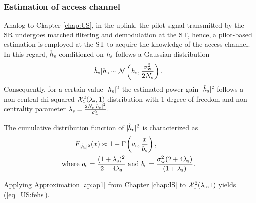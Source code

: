\subsubsection{Estimation of access channel}
Analog to Chapter \ref{chap:US}, in the uplink, the pilot signal transmitted by the SR undergoes matched filtering and demodulation at the ST, hence, a pilot-based estimation is employed at the ST to acquire the knowledge of the access channel. %
In this regard, $\hat{h}_{\text{s}}$ conditioned on $h_{\text{s}}$ follows a Gaussian distribution
\begin{align}
\hat{h}_{\text{s}}|h_{\text{s}} \sim \mathcal{N}\left( h_{\text{s}},\frac{\sigma^2_{\text{w}}}{2 N_{\text{s}}} \right).
\label{eq_US:ehs} 
\end{align}
Consequently, for a certain value $|h_{\text{s}}|^2$ the estimated power gain $|\hat{h}_{\text{s}}|^2$ follows a non-central chi-squared $\ncchi2(\ls, 1)$ distribution with 1 degree of freedom and non-centrality parameter $\lambda_{\text{s}} = \frac{2 N_{\text{s}} |h_{\text{s}}|^2}{\sigma^2_{\text{w}}}$. 
\begin{lemma} \label{lm_US:lm2}
\normalfont
The cumulative distribution function of $|\hat{h}_{\text{s}}|^2$ is characterized as 
\begin{align}
F_{|\hat{h}_{\text{s}}|^2}(x) \approx 1 - \Gamma&\left(a_{\text{s}}, \frac{x}{b_{\text{s}}}\right) \label{eq_US:fehs},\\ 
\text{where  } a_{\text{s}} = \frac{(1 + \lambda_{\text{s}})^2}{2 + 4 \lambda_{\text{s}}} &\text{ and } b_{\text{s}} = \frac{\sigma^2_{\text{w}} (2 + 4 \lambda_{\text{s}})}{(1 + \lambda_{\text{s}})}. \label{eq_US:para_s} 
\end{align} 
\end{lemma}
\begin{IEEEproof}
Applying Approximation \ref{ap:ap1} from Chapter \ref{chap:IS} to $\ncchi2(\ls,1 )$ yields (\ref{eq_US:fehs}). 
\end{IEEEproof}

